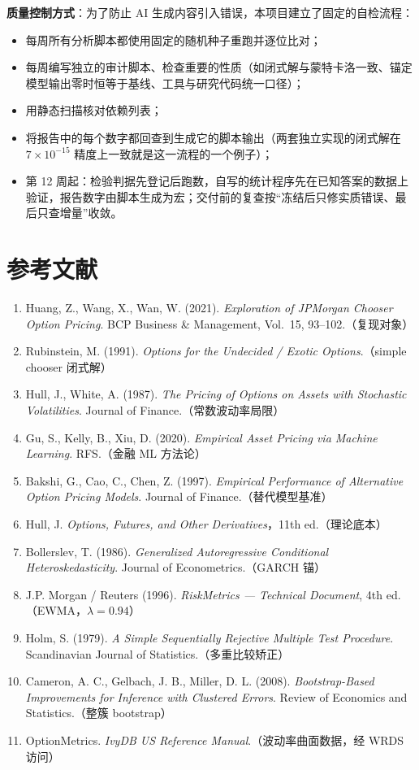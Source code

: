 \documentclass[11pt]{ctexart}
\begin{document}
\textbf{质量控制方式}：为了防止 AI 生成内容引入错误，本项目建立了固定的自检流程：
\begin{itemize}
  \item 每周所有分析脚本都使用固定的随机种子重跑并逐位比对；
  \item 每周编写独立的审计脚本、检查重要的性质（如闭式解与蒙特卡洛一致、锚定模型输出零时恒等于基线、工具与研究代码统一口径）；
  \item 用静态扫描核对依赖列表；
  \item 将报告中的每个数字都回查到生成它的脚本输出（两套独立实现的闭式解在 $7\times10^{-15}$ 精度上一致就是这一流程的一个例子）；
  \item 第 12 周起：检验判据先登记后跑数，自写的统计程序先在已知答案的数据上验证，报告数字由脚本生成为宏；交付前的复查按“冻结后只修实质错误、最后只查增量”收敛。
\end{itemize}

\section*{参考文献}
\begin{enumerate}
  \item Huang, Z., Wang, X., Wan, W. (2021). \textit{Exploration of JPMorgan Chooser Option Pricing}. BCP Business \& Management, Vol.~15, 93--102.（复现对象）
  \item Rubinstein, M. (1991). \textit{Options for the Undecided / Exotic Options}.（simple chooser 闭式解）
  \item Hull, J., White, A. (1987). \textit{The Pricing of Options on Assets with Stochastic Volatilities}. Journal of Finance.（常数波动率局限）
  \item Gu, S., Kelly, B., Xiu, D. (2020). \textit{Empirical Asset Pricing via Machine Learning}. RFS.（金融 ML 方法论）
  \item Bakshi, G., Cao, C., Chen, Z. (1997). \textit{Empirical Performance of Alternative Option Pricing Models}. Journal of Finance.（替代模型基准）
  \item Hull, J. \textit{Options, Futures, and Other Derivatives}，11th ed.（理论底本）
  \item Bollerslev, T. (1986). \textit{Generalized Autoregressive Conditional Heteroskedasticity}. Journal of Econometrics.（GARCH 锚）
  \item J.P. Morgan / Reuters (1996). \textit{RiskMetrics --- Technical Document}, 4th ed.（EWMA，$\lambda=0.94$）
  \item Holm, S. (1979). \textit{A Simple Sequentially Rejective Multiple Test Procedure}. Scandinavian Journal of Statistics.（多重比较矫正）
  \item Cameron, A. C., Gelbach, J. B., Miller, D. L. (2008). \textit{Bootstrap-Based Improvements for Inference with Clustered Errors}. Review of Economics and Statistics.（整簇 bootstrap）
  \item OptionMetrics. \textit{IvyDB US Reference Manual}.（波动率曲面数据，经 WRDS 访问）
\end{enumerate}
\end{document}
